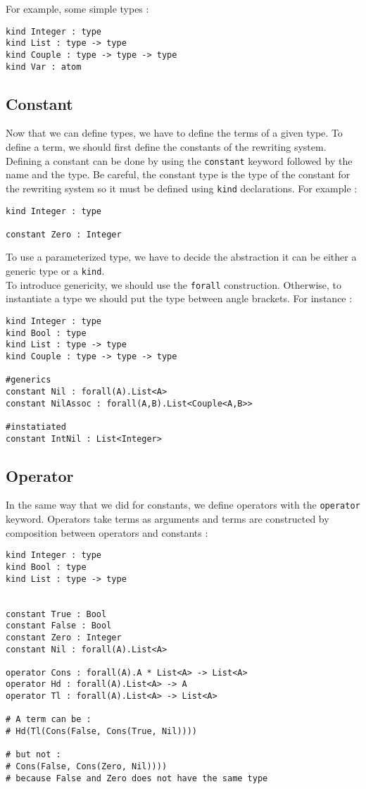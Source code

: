 \documentclass[12pt,a4paper]{article}
\begin{document}
For example, some simple types :
\begin{verbatim}
kind Integer : type
kind List : type -> type
kind Couple : type -> type -> type
kind Var : atom
\end{verbatim}


\subsection{Constant}
Now that we can define types, we have to define the terms of a given type.
To define a term, we should first define the constants of the rewriting
system.\\
Defining a constant can be done by using the \verb?constant? keyword followed
by the name and the type. Be careful, the constant
type is the type of the constant for the rewriting system so it must
be defined using \verb?kind? declarations. For example :

\begin{verbatim}
kind Integer : type

constant Zero : Integer
\end{verbatim}

To use a parameterized type, we have to decide the abstraction it can be
either a generic type or a \verb?kind?.\\
To introduce genericity, we should use the \verb?forall?
construction. Otherwise, to instantiate a type we should put the type
between angle brackets. For instance :

\begin{verbatim}
kind Integer : type
kind Bool : type
kind List : type -> type
kind Couple : type -> type -> type

#generics
constant Nil : forall(A).List<A>
constant NilAssoc : forall(A,B).List<Couple<A,B>>

#instatiated
constant IntNil : List<Integer>
\end{verbatim}

\subsection{Operator}
In the same way that we did for constants, we define operators with the
\verb?operator? keyword. Operators take terms as arguments and terms
are constructed by composition between operators and constants :

\begin{verbatim}
kind Integer : type
kind Bool : type
kind List : type -> type


constant True : Bool
constant False : Bool
constant Zero : Integer
constant Nil : forall(A).List<A>

operator Cons : forall(A).A * List<A> -> List<A>
operator Hd : forall(A).List<A> -> A
operator Tl : forall(A).List<A> -> List<A>

# A term can be :
# Hd(Tl(Cons(False, Cons(True, Nil))))

# but not :
# Cons(False, Cons(Zero, Nil))))
# because False and Zero does not have the same type
\end{verbatim}
\end{document}
